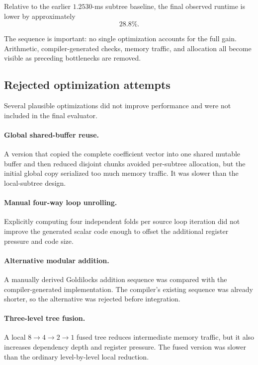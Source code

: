 Relative to the earlier \(1.2530\)-ms subtree baseline, the final observed
runtime is lower by approximately
\[
28.8\%.
\]

The sequence is important: no single optimization accounts for the full
gain.  Arithmetic, compiler-generated checks, memory traffic, and allocation
all become visible as preceding bottlenecks are removed.

\subsection{Rejected optimization attempts}

Several plausible optimizations did not improve performance and were not
included in the final evaluator.

\paragraph{Global shared-buffer reuse.}
A version that copied the complete coefficient vector into one shared
mutable buffer and then reduced disjoint chunks avoided per-subtree
allocation, but the initial global copy serialized too much memory traffic.
It was slower than the local-subtree design.

\paragraph{Manual four-way loop unrolling.}
Explicitly computing four independent folds per source loop iteration did
not improve the generated scalar code enough to offset the additional
register pressure and code size.

\paragraph{Alternative modular addition.}
A manually derived Goldilocks addition sequence was compared with the
compiler-generated implementation.  The compiler's existing sequence was
already shorter, so the alternative was rejected before integration.

\paragraph{Three-level tree fusion.}
A local \(8\to4\to2\to1\) fused tree reduces intermediate memory traffic,
but it also increases dependency depth and register pressure.  The fused
version was slower than the ordinary level-by-level local reduction.

